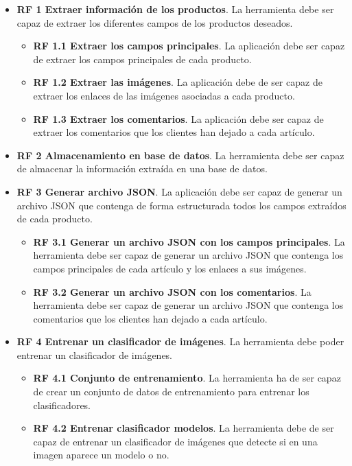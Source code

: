 \begin{itemize}
    \item \textbf{RF 1 Extraer información de los productos}. La herramienta debe ser capaz de extraer los diferentes campos de los productos deseados.
    \begin{itemize}
        \item \textbf{RF 1.1 Extraer los campos principales}. La aplicación debe ser capaz de extraer los campos principales de cada producto.
        \item \textbf{RF 1.2 Extraer las imágenes}. La aplicación debe de ser capaz de extraer los enlaces de las imágenes asociadas a cada producto.
        \item \textbf{RF 1.3 Extraer los comentarios}. La aplicación debe ser capaz de extraer los comentarios que los clientes han dejado a cada artículo.
    \end{itemize}
    \item \textbf{RF 2 Almacenamiento en base de datos}. La herramienta debe ser capaz de almacenar la información extraída en una base de datos.
    \item \textbf{RF 3 Generar archivo JSON}. La aplicación debe ser capaz de generar un archivo JSON que contenga de forma estructurada todos los campos extraídos de cada producto.
    \begin{itemize}
        \item \textbf{RF 3.1 Generar un archivo JSON con los campos principales}. La herramienta debe ser capaz de generar un archivo JSON que contenga los campos principales de cada artículo y los enlaces a sus imágenes.
        \item \textbf{RF 3.2 Generar un archivo JSON con los comentarios}. La herramienta debe ser capaz de generar un archivo JSON que contenga los comentarios que los clientes han dejado a cada artículo.
    \end{itemize}
    \item \textbf{RF 4 Entrenar un clasificador de imágenes}. La herramienta debe poder entrenar un clasificador de imágenes.
    \begin{itemize}
        \item \textbf{RF 4.1 Conjunto de entrenamiento}. La herramienta ha de ser capaz de crear un conjunto de datos de entrenamiento para entrenar los clasificadores.
        \item \textbf{RF 4.2 Entrenar clasificador modelos}. La herramienta debe de ser capaz de entrenar un clasificador de imágenes que detecte si en una imagen aparece un modelo o no.

\end{itemize}
\end{itemize}
